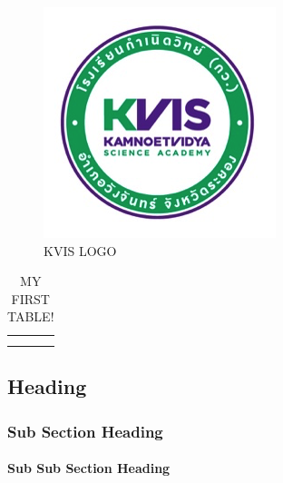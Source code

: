 \begin{figure}[h]
    \includegraphics{static/logo.png}
    \centering
    \caption{KVIS LOGO}%
\end{figure}

\begin{table}[h]
    \centering
    \begin{tabular}{c|c}
         &  \\
         & 
    \end{tabular}
    \caption{MY FIRST TABLE!}
\end{table}

\cite{Nobody06}

\subsection{Heading}

\subsubsection{Sub Section Heading}

\paragraph{Sub Sub Section Heading}
